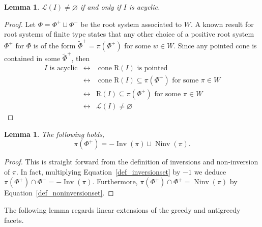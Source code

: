 \documentclass{amsart}
\newtheorem{lemma}[theorem]{Lemma}
\theoremstyle{definition}
\DeclareMathOperator{\cone}{cone} %
\DeclareMathOperator{\Inv}{Inv} %
\DeclareMathOperator{\Ninv}{Ninv} %
\newcommand{\linearExtensions}{\mathcal{L}} %
\newcommand{\Roots}{\mathrm{R}} %
\begin{document}
\begin{lemma}
\label{lem_acyclic_nonempty}
$\linearExtensions(I)\neq \varnothing$ if and only if $I$ is acyclic.
\end{lemma}
\begin{proof}
Let $\Phi=\Phi^+\sqcup\Phi^-$ be the root system associated to $W$.
A known result for root systems of finite type states that any other choice of a positive root system $\Phi^+$ for $\Phi$ is of the form $\widetilde \Phi^+=\pi(\Phi^+)$ for some $w\in W$.
Since any pointed cone is contained in some $\widetilde \Phi^+$, then 
\[
\begin{array}{rcl}
I \text{ is acyclic}  & \longleftrightarrow  &  \cone \Roots(I) \text{ is pointed} \\
  & \longleftrightarrow  & \cone \Roots(I)\subseteq \pi(\Phi^+) \text{ for some } \pi\in W \\
  & \longleftrightarrow  &  \Roots(I)\subseteq \pi(\Phi^+) \text{ for some } \pi\in W \\
  & \longleftrightarrow  &  \linearExtensions(I) \neq \varnothing 
\end{array}
\]
\end{proof}

\begin{lemma}
\label{lem_pi_phiplus_inv_ninv}
The following holds,
\[
\pi(\Phi^+)=-\Inv(\pi)\sqcup \Ninv(\pi).
\]
\end{lemma}

\begin{proof}
This is straight forward from the definition of inversions and non-inversion of $\pi$.
In fact, multiplying Equation~\eqref{def_inversionset} by $-1$ we deduce $\pi(\Phi^+)\cap \Phi^-=-\Inv(\pi)$.
Furthermore,  
$\pi(\Phi^+)\cap \Phi^+=\Ninv(\pi)$ by Equation~\eqref{def_noninversionset}.
\end{proof}

The following lemma regards linear extensions of the greedy and antigreedy facets.
\end{document}
